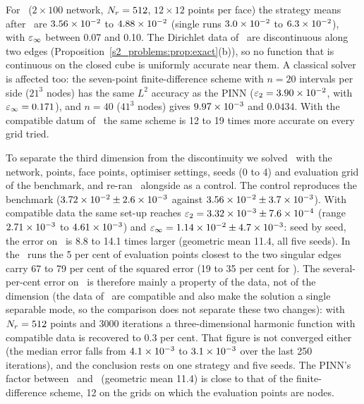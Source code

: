 For \PLthree\ ($2\times 100$ network, $N_{r}=512$, $12\times 12$ points per face) the
strategy means after \AdamLBFGS\ are $3.56\times 10^{-2}$ to $4.88\times 10^{-2}$ (single runs
$3.0\times 10^{-2}$ to $6.3\times 10^{-2}$), with $\varepsilon_{\infty}$ between 0.07 and 0.10.
The Dirichlet data of \PLthree\ are discontinuous along two edges
(Proposition~\ref{s2_problems:prop:exact}(b)), so no function that is continuous on the
closed cube is uniformly accurate near them. A classical solver is affected too: the
seven-point finite-difference scheme with $n=20$ intervals per side ($21^3$ nodes) has the
same $L^2$ accuracy as the PINN ($\varepsilon_{2}=3.90\times 10^{-2}$, with $\varepsilon_{\infty}=0.171$), and $n=40$
($41^3$ nodes) gives $9.97\times 10^{-3}$ and $0.0434$.
With the compatible datum of \PLthreeS\ the same scheme is 12 to 19 times more accurate on
every grid tried.

To separate the third dimension from the discontinuity we solved \PLthreeS\ with the network,
 points, face points, optimiser settings, seeds (0 to 4) and evaluation grid of
the benchmark, and re-ran \PLthree\ alongside as a control.
The control reproduces the benchmark ($3.72\times 10^{-2}\pm2.6\times 10^{-3}$ against
$3.56\times 10^{-2}\pm3.7\times 10^{-3}$). With compatible data the same set-up reaches
$\varepsilon_{2}=3.32\times 10^{-3}\pm7.6\times 10^{-4}$ (range $2.71\times 10^{-3}$ to $4.61\times 10^{-3}$) and
$\varepsilon_{\infty}=1.14\times 10^{-2}\pm4.7\times 10^{-3}$: seed by seed, the error on \PLthree\ is 8.8 to 14.1
times larger (geometric mean 11.4, all five seeds).
In the \PLthree\ runs the 5 per cent of evaluation points closest to the two singular edges
carry 67 to 79 per cent of the squared error (19 to 35 per cent for \PLthreeS).
The several-per-cent error on \PLthree\ is therefore mainly a property of the data, not of
the dimension (the data of \PLthreeS\ are compatible and also make the solution a single
separable mode, so the comparison does not separate these two changes): with $N_{r}=512$ points
and 3000 iterations a three-dimensional harmonic function with compatible data is recovered
to 0.3 per cent.
That figure is not converged either (the median error falls from $4.1\times 10^{-3}$ to
$3.1\times 10^{-3}$ over the last 250 iterations), and the conclusion rests on one strategy and
five seeds. The PINN's factor between \PLthree\ and \PLthreeS\ (geometric mean 11.4) is close
to that of the finite-difference scheme, 12 on the grids on which the evaluation points are
nodes.


